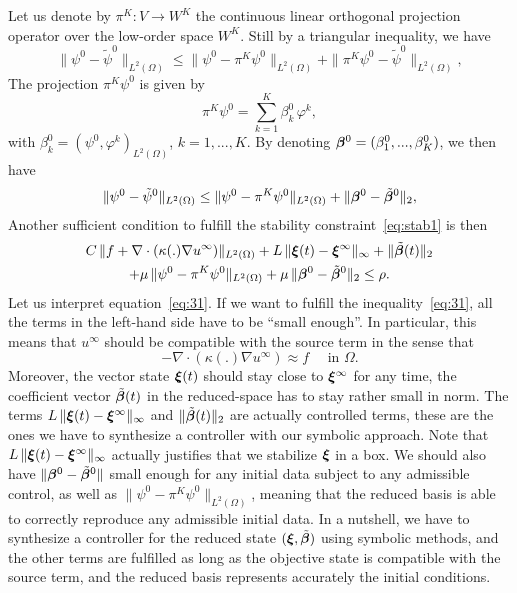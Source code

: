 Let us denote by $\pi^K:V\rightarrow W^K$ the continuous linear orthogonal projection operator over
the low-order space $W^K$. Still by a triangular inequality, we have
\[
\|\psi^0-\tilde \psi^0\|_{L^2(\Omega)} \leq
\|\psi^0-\pi^K \psi^0\|_{L^2(\Omega)} + \|\pi^K\psi^0-\tilde \psi^0\|_{L^2(\Omega)},
\]
The projection $\pi^K \psi^0$ is given by
\[
\pi^K \psi^0 = \sum_{k=1}^K \beta_k^0\, \varphi^k, 
\]
with $\beta_k^0=(\psi^0,\varphi^k)_{L^2(\Omega)}$, $k=1,...,K$. By denoting 
$\bm{\beta}^0=(\beta_1^0,...,\beta_K^0)$, we then have
\[
\|\psi^0-\tilde \psi^0\|_{L^2(\Omega)} \leq
\|\psi^0-\pi^K \psi^0\|_{L^2(\Omega)} + \|\bm{\beta}^0-\tilde {\bm{\beta}}^0\|_2,
\]
Another sufficient condition to fulfill the stability constraint~\eqref{eq:stab1}
is then
%
\begin{multline}
\small
C\, \|f+\nabla\cdot(\kappa(.)\nabla u^\infty)\|_{L^2(\Omega)} + L\,\|\bm{\xi}(t)-\bm{\xi}^\infty\|_\infty + \|\tilde{\bm{\beta}}(t)\|_2 \\
+ \mu\, \|\psi^0-\pi^K\psi^0\|_{L^2(\Omega)}+ \mu\, \|\bm{\beta}^0-\tilde {\bm{\beta}}^0\|_2 \leq \rho.
\label{eq:31}
\normalsize
\end{multline}
%
Let us interpret equation~\eqref{eq:31}. 
If we want to fulfill the inequality~\eqref{eq:31}, all the terms in the left-hand
side have to be ``small enough''. In particular, this means that $u^\infty$ should
be compatible with the source term in the sense that
\[
-\nabla\cdot(\kappa(.)\nabla u^\infty) \approx f \quad \mbox{ in } \Omega.
\]
Moreover, the vector state $\bm{\xi}(t)$ should stay close to $\bm{\xi}^\infty$ for any time,
the coefficient vector $\tilde {\bm{\beta}}(t)$ in the reduced-space has to stay rather small in norm.
The terms $L\,\|\bm{\xi}(t)-\bm{\xi}^\infty\|_\infty$ and $\|\tilde{\bm{\beta}}(t)\|_2$ are actually
controlled terms, these are the ones we have to synthesize a controller with 
our symbolic approach. Note that $L\,\|\bm{\xi}(t)-\bm{\xi}^\infty\|_\infty$ actually
justifies that we stabilize $\bm{\xi}$ in a box. 
We should also have $\|\bm{\beta}^0-\tilde {\bm{\beta}}^0\|$ small enough for any initial data subject to any admissible control, as well as $\|\psi^0-\pi^K\psi^0\|_{L^2(\Omega)}$, meaning that the reduced basis is able to correctly reproduce any admissible initial data. 
In a nutshell, we have to synthesize a controller for the reduced state $(\bm{\xi},\tilde {\bm{\beta}})$ using symbolic
methods, and the other terms are fulfilled as long as the objective state
is compatible with the source term, and the reduced basis represents accurately 
the initial conditions.

